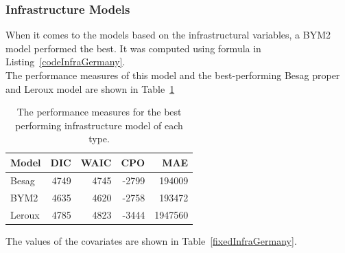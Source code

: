 \subsubsection{Infrastructure Models}\label{sssec:infraGermany}
When it comes to the models based on the infrastructural variables, a BYM2 model performed the best. It was computed using formula in Listing~\ref{codeInfraGermany}. \\
The performance measures of this model and the best-performing Besag proper and Leroux model are shown in Table~\ref{infraGermany}
\begin{table}[H] 
\caption{The performance measures for the best performing infrastructure model of each type. \label{infraGermany}}
\begin{tabular}{l r r r r}
\toprule
\textbf{Model}	& \textbf{DIC}	& \textbf{WAIC} & \textbf{CPO} & \textbf{MAE}\\
\midrule
Besag & 4749 & 4745 & -2799 & 194009\\
BYM2 & 4635 & 4620 & -2758 & 193472\\
Leroux & 4785 & 4823 & -3444 & 1947560\\
\bottomrule
\end{tabular}
\end{table}
The values of the covariates are shown in Table~\ref{fixedInfraGermany}.
